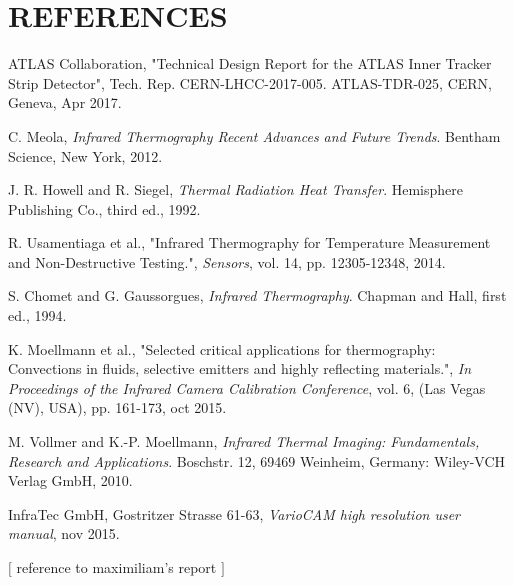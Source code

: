 \pagestyle{references}

\section*{\uppercase{References}}\label{referen}
	\bigskip
	\bigskip
	\begin{enumerate}[label={[\arabic*]}]
	
		\item ATLAS Collaboration, "Technical Design Report for the ATLAS Inner Tracker Strip Detector", Tech. Rep. CERN-LHCC-2017-005. ATLAS-TDR-025, CERN, Geneva, Apr 2017.\label{ref1}
		
		\item C. Meola,	\textit{Infrared Thermography Recent Advances and Future Trends}. Bentham Science, New York, 2012.\label{ref2}
		
		\item J. R. Howell and R. Siegel, \textit{Thermal Radiation Heat Transfer}. Hemisphere Publishing Co., third ed., 1992.\label{ref3}
		
		\item R. Usamentiaga et al., "Infrared Thermography for Temperature Measurement and Non-Destructive Testing.", \textit{Sensors}, vol. 14, pp. 12305-12348, 2014.\label{ref4}
		 
		\item S. Chomet and G. Gaussorgues, \textit{Infrared Thermography}. Chapman and Hall, first ed., 1994.\label{ref5}
		
		\item K. Moellmann et al., "Selected critical applications for thermography: Convections in fluids, selective emitters and highly reflecting materials.", \textit{In Proceedings of the Infrared Camera Calibration Conference}, vol. 6, (Las Vegas (NV), USA), pp. 161-173, oct 2015.\label{ref6}
		
		\item M. Vollmer and K.-P. Moellmann,	\textit{Infrared Thermal Imaging: Fundamentals, Research and Applications}. Boschstr. 12, 69469 Weinheim, Germany: Wiley-VCH Verlag GmbH, 2010.\label{ref7}
		
		\item InfraTec GmbH, Gostritzer Strasse 61-63, \textit{VarioCAM \textregistered\space high resolution user manual}, nov 2015.\label{ref8}
		
		\item $[$ reference to maximiliam's report $]$\label{ref9}
		

\end{enumerate}
